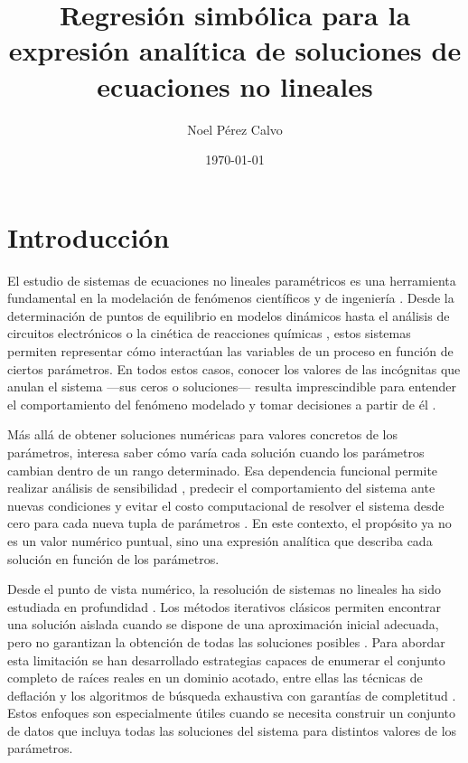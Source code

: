 \documentclass[12pt,a4paper]{article} \usepackage[utf8]{inputenc} \usepackage[spanish]{babel} \usepackage{amsmath, amssymb, amsthm} \usepackage{bm} \usepackage{float} \usepackage{longtable} \usepackage[hidelinks]{hyperref}
\title{Regresión simbólica para la expresión analítica de soluciones de ecuaciones no lineales} \author{Noel Pérez Calvo} \date{\today}
\begin{document}
\maketitle

\tableofcontents \newpage

\section*{Introducción}
\label{sec:introduccion}

El estudio de sistemas de ecuaciones no lineales paramétricos es una
herramienta fundamental en la modelación de fenómenos científicos y de
ingeniería \cite{gershenfeld2012nature}.  Desde la determinación de
puntos de equilibrio en modelos dinámicos \cite{strogatz2018nonlinear}
hasta el análisis de circuitos electrónicos \cite{horowitz2015art} o la
cinética de reacciones químicas \cite{laidler1987chemical}, estos
sistemas permiten representar cómo interactúan las variables de un
proceso en función de ciertos parámetros.  En todos estos casos, conocer
los valores de las incógnitas que anulan el sistema —sus ceros o
soluciones— resulta imprescindible para entender el comportamiento del
fenómeno modelado y tomar decisiones a partir de él
\cite{allgower1990numerical}.

Más allá de obtener soluciones numéricas para valores concretos de los
parámetros, interesa saber cómo varía cada solución cuando los
parámetros cambian dentro de un rango determinado.  Esa dependencia
funcional permite realizar análisis de sensibilidad
\cite{saltelli2008global}, predecir el comportamiento del sistema ante
nuevas condiciones \cite{forrester2008engineering} y evitar el costo
computacional de resolver el sistema desde cero para cada nueva tupla
de parámetros \cite{eldred2009formulations}.  En este contexto, el
propósito ya no es un valor numérico puntual, sino una expresión
analítica que describa cada solución en función de los parámetros.

Desde el punto de vista numérico, la resolución de sistemas no lineales
ha sido estudiada en profundidad \cite{burden2010numerical}.  Los
métodos iterativos clásicos \cite{nocedal2006numerical} permiten
encontrar una solución aislada cuando se dispone de una aproximación
inicial adecuada, pero no garantizan la obtención de todas las
soluciones posibles \cite{meleshko1991nonlinear}.  Para abordar esta
limitación se han desarrollado estrategias capaces de enumerar el
conjunto completo de raíces reales en un dominio acotado, entre ellas
las técnicas de deflación \cite{ojika1983deflation} y los algoritmos de
búsqueda exhaustiva con garantías de completitud
\cite{bartnik2024mdcm}.  Estos enfoques son especialmente útiles cuando
se necesita construir un conjunto de datos que incluya todas las
soluciones del sistema para distintos valores de los parámetros.
\end{document}
